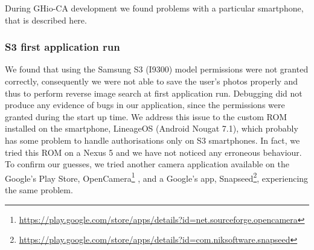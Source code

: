 During GHio-CA development we found problems with a particular smartphone, 
that is described here.

\subsubsection{S3 first application run}

We found that using the Samsung S3 (I9300) model permissions were not granted correctly, consequently we were not able to save the user's photos properly and thus to perform reverse image search at first application run. Debugging did not produce any evidence of bugs in our application, since the permissions 
were granted during the start up time.
We address this issue to the custom ROM installed on the smartphone, LineageOS 
(Android Nougat 7.1), which probably has some problem to handle authorisations only on S3 smartphones. In fact, we tried this ROM on a Nexus 5 and we have not noticed any erroneous behaviour. To confirm our guesses, we tried another camera application available on the Google's Play Store, OpenCamera\footnote{\url{https://play.google.com/store/apps/details?id=net.sourceforge.opencamera}}
, and a Google's app, Snapseed\footnote{\url{https://play.google.com/store/apps/details?id=com.niksoftware.snapseed}}, experiencing the same problem.